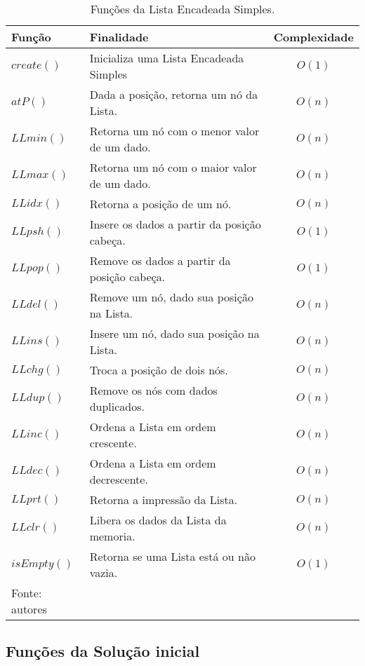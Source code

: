 \documentclass[12pt,a4paper]{article}
\begin{document}
\begin{table}[H]
	\renewcommand{\arraystretch}{1}
	\centering
	\caption{Funções da Lista Encadeada Simples.}
	\label{tab:linkedlist}
	\begin{tabular}{p{2.7cm} p{9.5cm} c}
		\toprule 
		Função & Finalidade & Complexidade \\ 
		\midrule
		$create()$ & Inicializa uma Lista Encadeada Simples & $O(1)$ \\
		$atP()$ & Dada a posição, retorna um nó da Lista. & $O(n)$ \\
		$LLmin()$ & Retorna um nó com o menor valor de um dado. & $O(n)$ \\
		$LLmax()$ & Retorna um nó com o maior valor de um dado. & $O(n)$ \\
		$LLidx()$ & Retorna a posição de um nó. & $O(n)$ \\
		$LLpsh()$ & Insere os dados a partir da posição cabeça. & $O(1)$ \\
		$LLpop()$ & Remove os dados a partir da posição cabeça. & $O(1)$ \\
		$LLdel()$ & Remove um nó, dado sua posição na Lista. & $O(n)$ \\
		$LLins()$ & Insere um nó, dado sua posição na Lista. & $O(n)$ \\
		$LLchg()$ & Troca a posição de dois nós. & $O(n)$ \\
		$LLdup()$ & Remove os nós com dados duplicados. & $O(n)$ \\
		$LLinc()$ & Ordena a Lista em ordem crescente. & $O(n)$ \\
		$LLdec()$ & Ordena a Lista em ordem decrescente. & $O(n)$ \\
		$LLprt()$ & Retorna a impressão da Lista. & $O(n)$ \\
		$LLclr()$ & Libera os dados da Lista da memoria. & $O(n)$ \\
		$isEmpty()$ & Retorna se uma Lista está ou não vazia. & $O(1)$ \\
		\bottomrule
		\footnotesize Fonte: autores
	\end{tabular}
\end{table}

\subsection{Funções da Solução inicial}
\end{document}
